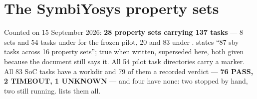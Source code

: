 \section{The SymbiYosys property sets}
\label{sec:verif-sby}

Counted on 15 September 2026: \textbf{28 property sets carrying 137 tasks} --- 8 sets and 54 tasks under  for the frozen pilot, 20 and 83 under .  states ``87 sby tasks across 16 property sets''; true when written, superseded here, both given because the document still says it. All 54 pilot task directories carry a  marker. All 83 SoC tasks have a workdir and 79 of them a recorded verdict --- \textbf{76 PASS, 2 TIMEOUT, 1 UNKNOWN} --- and four have none: two stopped by hand, two still running.  lists them all.

